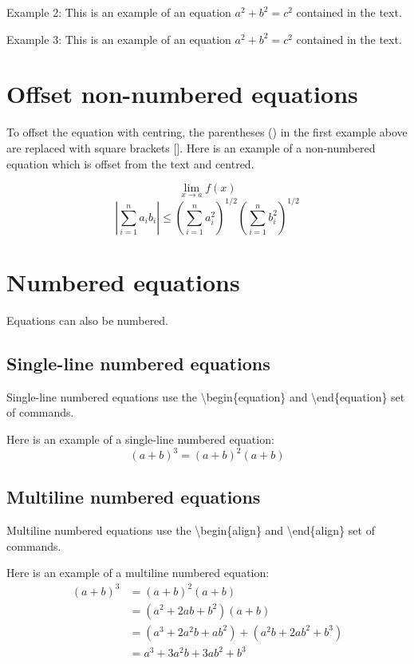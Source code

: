 \documentclass[12pt]{MUNThesisBibTeX}
\begin{document}
Example 2: This is an example of an equation $a^2 + b^2 = c^2$ contained in the text.

Example 3: This is an example of an equation
\begin{math}
 a^2 + b^2 = c^2
\end{math}
contained in the text.

\section{Offset non-numbered equations}

To offset the equation with centring, the parentheses () in the first example above are replaced with square brackets []. Here is an example of a non-numbered equation which is offset from the text and centred.

\[
\lim_{x \to a}f(x)
\]
\[
\left|\sum_{i=1}^n a_ib_i\right| \le \left(\sum_{i=1}^n
a_i^2\right)^{1/2} \left(\sum_{i=1}^n b_i^2\right)^{1/2}
\]

\section{Numbered equations}
Equations can also be numbered.

\subsection{Single-line numbered equations}

Single-line numbered equations use the \textbackslash begin\{equation\} and \textbackslash end\{equation\} set of commands.

Here is an example of a single-line numbered equation:
\begin{equation}
(a+b)^3 = (a+b)^2(a+b)
\end{equation}

\subsection{Multiline numbered equations}

Multiline numbered equations use the \textbackslash begin\{align\} and \textbackslash end\{align\} set of commands.

Here is an example of a multiline numbered equation:
\begin{align}
(a+b)^3 &= (a+b)^2(a+b)\\
&=(a^2+2ab+b^2)(a+b)\\
&=(a^3+2a^2b+ab^2) + (a^2b+2ab^2+b^3)\\
&=a^3+3a^2b+3ab^2+b^3
\end{align}
\end{document}
